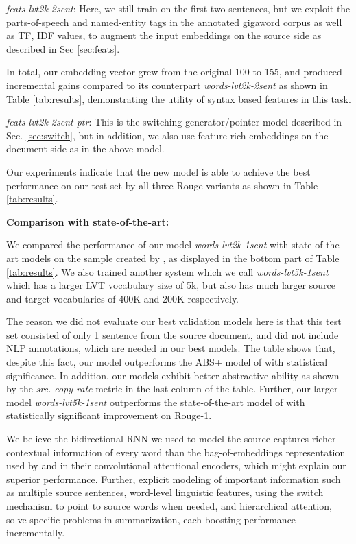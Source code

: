 {\it feats-lvt2k-2sent}:  Here, we still train on the first two sentences, but we exploit the parts-of-speech and named-entity tags in the annotated gigaword corpus as well as TF, IDF values, to augment the input embeddings on the source side as described in Sec \ref{sec:feats}.

In total, our embedding vector grew from the original 100 to 155, and produced incremental gains compared to its counterpart {\it words-lvt2k-2sent} as shown in Table \ref{tab:results}, demonstrating the utility of syntax based features in this task. 

{\it feats-lvt2k-2sent-ptr}: This is the switching generator/pointer model described in Sec. \ref{sec:switch}, but in addition, we also use feature-rich embeddings on the document side as in the above model.

Our experiments indicate that the new model is able to achieve the best performance on our test set by all three Rouge variants as shown in Table \ref{tab:results}.

{\bf Comparison with state-of-the-art:} 

We compared the performance of our model {\it words-lvt2k-1sent} with state-of-the-art models on the sample created by , as displayed in the bottom part of Table \ref{tab:results}. We also trained another system which we call {\it words-lvt5k-1sent} which has a larger LVT vocabulary size of 5k, but also has much larger source and target vocabularies of 400K and 200K respectively.

The reason we did not evaluate our best validation models here is that this test set consisted of only 1 sentence from the source document, and did not include NLP annotations, which are needed in our best models. The table shows that, despite this fact, our model outperforms the ABS+ model of  with statistical significance. In addition, our models exhibit better abstractive ability as shown by the {\it src. copy rate} metric in the last column of the table. Further, our larger model {\it words-lvt5k-1sent} outperforms the state-of-the-art model of \cite{chopra} with statistically significant improvement on Rouge-1. 

We believe the bidirectional RNN we used to model the source captures richer contextual information of every word than the bag-of-embeddings representation used by  and  in their convolutional attentional encoders, which might explain our superior performance. Further, explicit modeling of important information such as multiple source sentences, word-level linguistic features, using the switch mechanism to point to source words when needed, and hierarchical attention, solve specific problems in summarization, each boosting performance incrementally. 


